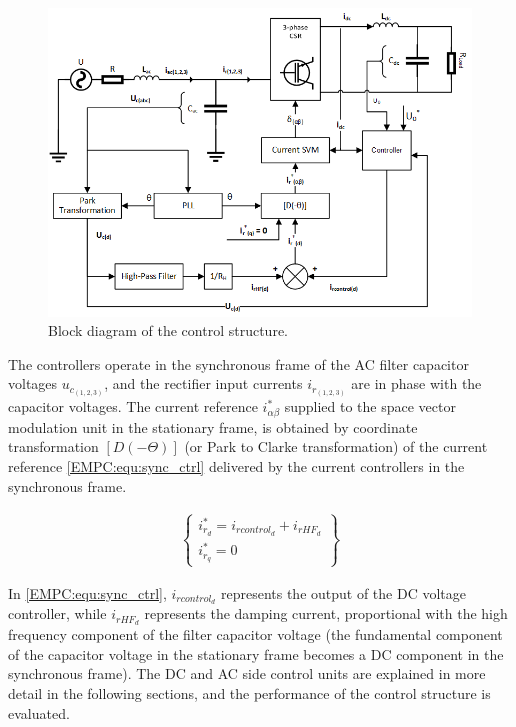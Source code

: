     \begin{figure}[!ht]
        \centering
        \includegraphics[width=\textwidth]{EMPC_PNG_Pics/ControlStructure.png}
        \caption{Block diagram of the control structure.}
        \label{EMPC:fig:ControlStruct}
    \end{figure}

    The controllers operate in the synchronous frame of the AC filter capacitor voltages $u_{c_{(1,2,3)}}$, and the rectifier input currents $i_{r_{(1,2,3)}}$ are in phase with the capacitor voltages.
    The current reference $i^*_{\alpha\beta}$ supplied to the space vector modulation unit in the stationary frame, is obtained by coordinate transformation $[D(-\Theta)]$ (or Park to Clarke transformation) of the current reference \ref{EMPC:equ:sync_ctrl} delivered by the current controllers in the synchronous frame.

    \begin{equation}
        \begin{array}{rcl}
            \begin{Bmatrix}
                i^*_{r_d}=i_{rcontrol_d}+i_{rHF_d}\\
                i^*_{r_q}=0
            \end{Bmatrix}
        \end{array}
        \label{EMPC:equ:sync_ctrl}
    \end{equation}

    In \ref{EMPC:equ:sync_ctrl}, $i_{rcontrol_d}$ represents the output of the DC voltage controller, while $i_{rHF_d}$ represents the damping current, proportional with the high frequency component of the filter capacitor voltage (the fundamental component of the capacitor voltage in the stationary frame becomes a DC component in the synchronous frame). The DC and AC side control units are explained in more detail in the following sections, and the performance of the control structure is evaluated.
		
